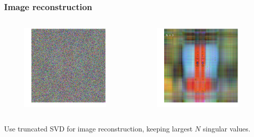 \documentclass[xcolor={dvipsnames}]{beamer}
\begin{document}
\begin{frame}
\frametitle{Image reconstruction}
\begin{columns}
\hspace{-0.25in}
\begin{figure}
\includegraphics[width=\textwidth]{figs/noise-mandrill.png}
\end{figure}
\begin{figure}
\includegraphics[width=\textwidth]{figs/noise-mandrill-3.png}
\end{figure}
\end{columns}
Use truncated SVD for image reconstruction, keeping largest $N$ singular values.
\end{frame}
\end{document}
